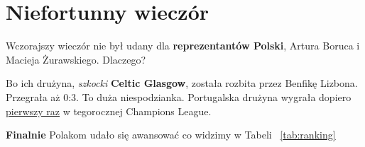 {\Large
\setlength{\parindent}{20pt}
\section*{Niefortunny wieczór}
Wczorajszy wieczór nie był udany dla \textbf{reprezentantów Polski}, Artura Boruca i Macieja Żurawskiego. Dlaczego?


Bo ich drużyna, \textit{szkocki} \textbf{Celtic Glasgow}, została rozbita przez Benfikę Lizbona. Przegrała aż 0:3. To duża niespodzianka. Portugalska drużyna wygrała dopiero \underline{pierwszy raz} w tegorocznej Champions League.


\textbf{Finalnie} Polakom udało się awansować co widzimy w Tabeli ~\ref{tab:ranking}
}




